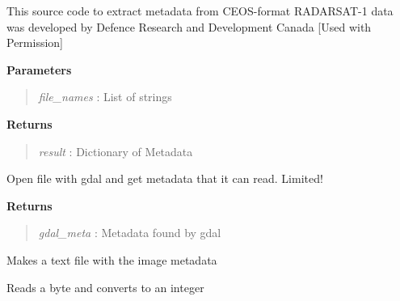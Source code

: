 \documentclass[letterpaper,10pt,openany,oneside]{sphinxmanual}
\begin{document}
\begin{fulllineitems}
\begin{fulllineitems}
This source code to extract metadata from CEOS-format RADARSAT-1 
data was developed by Defence Research and Development Canada
{[}Used with Permission{]}

\textbf{Parameters}
\begin{quote}

\emph{file\_names} : List of strings
\end{quote}

\textbf{Returns}
\begin{quote}

\emph{result}     : Dictionary of Metadata
\end{quote}

\end{fulllineitems}


\begin{fulllineitems}
\label{code:Metadata.Metadata.getgdalmeta}
Open file with gdal and get metadata that it can read. Limited!

\textbf{Returns}
\begin{quote}

\emph{gdal\_meta} : Metadata found by gdal
\end{quote}

\end{fulllineitems}


\begin{fulllineitems}
\label{code:Metadata.Metadata.saveMetaFile}
Makes a text file with the image metadata

\end{fulllineitems}


\end{fulllineitems}


\begin{fulllineitems}
\label{code:Metadata.byte2int}
Reads a byte and converts to an integer

\end{fulllineitems}

\end{document}
